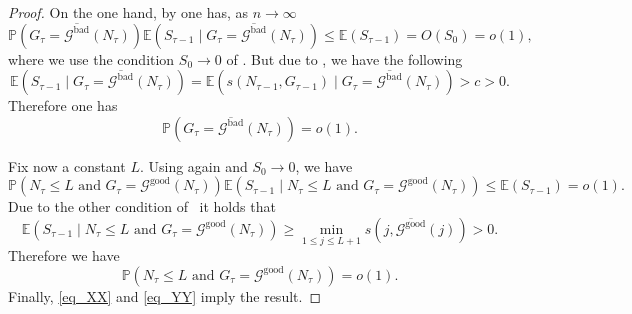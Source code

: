 \documentclass[a4paper,12pt]{article}
\theoremstyle{definition}
\renewcommand{\P}{\mathbb{P}}
\newcommand{\nto}{\ensuremath{n\rightarrow\infty}}
\newcommand{\bigO}[1]{O\left({#1}\right)}
\newcommand{\good}[1]{\mathcal{G}^{\text{good}}({#1})}
\newcommand{\goodo}[1]{\overline{\mathcal{G}^{\text{good}}}({#1})}
\newcommand{\bado}[1]{\overline{\mathcal{G}^{\text{bad}}}({#1})}
\begin{document}
\begin{proof}
    On the one hand, by  one has, as $\nto$ 
    \[
        \P(G_\tau=\bado{N_\tau}) \mathbb{E}(S_{\tau-1} \mid G_\tau=\bado{N_\tau}) \leq \mathbb{E}(S_{\tau-1})=\bigO{S_0}=o(1),
    \]
    where we use the condition $S_{0}\to 0$ of . But due to , we have the following
    \[\mathbb{E}(S_{\tau-1} \mid G_\tau=\bado{N_\tau}) = \mathbb{E}(s(N_{\tau-1},G_{\tau-1}) \mid G_\tau=\bado{N_\tau})>c>0.\]
    Therefore one has 
    \begin{equation}\label{eq_XX}
        \P(G_\tau=\bado{N_\tau})=o(1).
    \end{equation}

Fix now a constant $L$. Using again  and $S_{0}\to 0$, we have
\[
    \P(N_\tau\leq L\text{ and }G_\tau=\good{N_\tau})\mathbb{E}(S_{\tau-1} \mid N_\tau\leq L\text{ and }G_\tau=\good{N_\tau})\leq \mathbb{E}(S_{\tau-1})=o(1).
\]
Due to the other condition of~ it holds that 
\[\mathbb{E}(S_{\tau-1} \mid N_\tau\leq L\text{ and }G_\tau=\good{N_\tau})\geq \min_{1\leq j\leq L+1}s(j,\goodo{j})>0.\] 
Therefore we have
\begin{equation}\label{eq_YY}
   \P(N_\tau\leq L\text{ and }G_\tau=\good{N_\tau})=o(1).
\end{equation}
Finally, \eqref{eq_XX} and \eqref{eq_YY} imply the result.
\end{proof}
\end{document}
